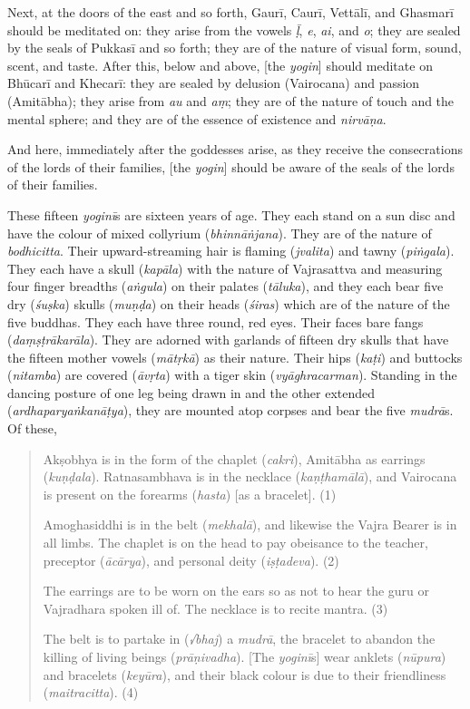 \documentclass[naipra.tex]{subfiles}
\begin{document}
Next, at the doors of the east and so forth, Gaurī, Caurī, Vettālī, and Ghasmarī should be meditated on: they arise from the vowels \emph{ḹ}, \emph{e}, \emph{ai}, and \emph{o}; they are sealed by the seals of Pukkasī and so forth; they are of the nature of visual form, sound, scent, and taste.
After this, below and above, [the \emph{yogin}] should meditate on Bhūcarī and Khecarī: they are sealed by delusion (Vairocana) and passion (Amitābha); they arise from \emph{au} and \emph{aṃ}; they are of the nature of touch and the mental sphere; and they are of the essence of existence and \emph{nirvāṇa}.

And here, immediately after the goddesses arise, as they receive the consecrations of the lords of their families, [the \emph{yogin}] should be aware of the seals of the lords of their families. 

These fifteen \emph{yoginī}s are sixteen years of age.
They each stand on a sun disc and have the colour of mixed collyrium (\emph{bhinnāṅjana}).
They are of the nature of \emph{bodhicitta}.
Their upward-streaming hair is flaming (\emph{jvalita}) and tawny (\emph{piṅgala}).
They each have a skull (\emph{kapāla}) with the nature of Vajrasattva and measuring four finger breadths (\emph{aṅgula}) \crux on their palates (\emph{tāluka})\crux , and they each bear five dry (\emph{śuṣka}) skulls (\emph{muṇḍa}) on their heads (\emph{śiras}) which are of the nature of the five buddhas.
They each have three round, red eyes.
Their faces bare fangs (\emph{daṃṣṭrākarāla}).
They are adorned with garlands of fifteen dry skulls that have the fifteen mother vowels (\emph{mātṛkā}) as their nature.
Their hips (\emph{kaṭi}) and buttocks (\emph{nitamba}) are covered (\emph{āvṛta}) with a tiger skin (\emph{vyāghracarman}).
Standing in the dancing posture of one leg being drawn in and the other extended (\emph{ardhaparyaṅkanāṭya}), they are mounted atop corpses and bear the five \emph{mudrā}s. 
Of these,

\begin{quote}
	Akṣobhya is in the form of the chaplet (\emph{cakri}), Amitābha as earrings (\emph{kuṇḍala}).
	Ratnasambhava is in the necklace (\emph{kaṇṭhamālā}), and Vairocana is present on the forearms (\emph{hasta}) [as a bracelet]. (1)
	
	Amoghasiddhi is in the belt (\emph{mekhalā}), and likewise the Vajra Bearer is in all limbs.
	The chaplet is on the head to pay obeisance to the teacher, preceptor (\emph{ācārya}), and personal deity (\emph{iṣṭadeva}). (2)

	The earrings are to be worn on the ears so as not to hear the guru or Vajradhara spoken ill of.
	The necklace is to recite mantra. (3)

	The belt is to partake in (\emph{√bhaj}) a \emph{mudrā}, the bracelet to abandon the killing of living beings (\emph{prāṇivadha}). 
	[The \emph{yoginī}s] wear anklets (\emph{nūpura}) and bracelets (\emph{keyūra}), and their black colour is due to their friendliness (\emph{maitracitta}). (4)
\end{quote}
\end{document}
